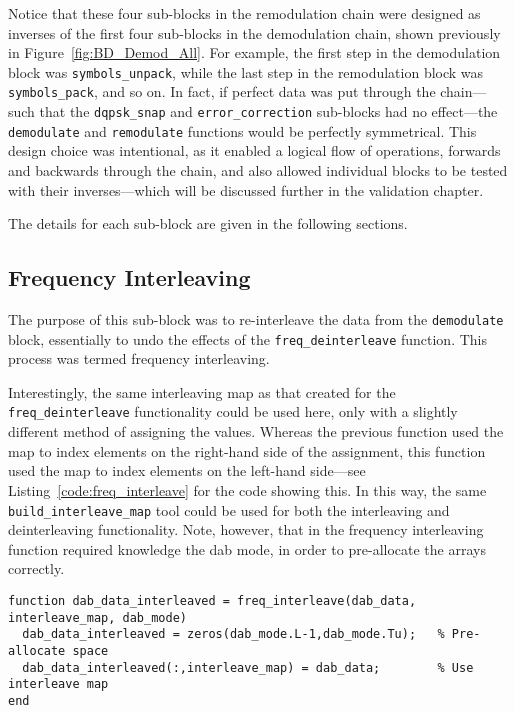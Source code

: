 \documentclass[class=report,11pt,crop=false]{standalone}
\begin{document}
Notice that these four sub-blocks in the remodulation chain were designed as inverses of the first four sub-blocks in the demodulation chain, shown previously in Figure~\ref{fig:BD_Demod_All}. For example, the first step in the demodulation block was \texttt{symbols\_unpack}, while the last step in the remodulation block was \texttt{symbols\_pack}, and so on. In fact, if perfect data was put through the chain---such that the \texttt{dqpsk\_snap} and \texttt{error\_correction} sub-blocks had no effect---the \texttt{demodulate} and \texttt{remodulate} functions would be perfectly symmetrical. This design choice was intentional, as it enabled a logical flow of operations, forwards and backwards through the chain, and also allowed individual blocks to be tested with their inverses---which will be discussed further in the validation chapter.

The details for each sub-block are given in the following sections.

\subsection{Frequency Interleaving \label{subsect:dab-proc_freq-interleave}}
The purpose of this sub-block was to re-interleave the data from the \texttt{demodulate} block, essentially to undo the effects of the \texttt{freq\_deinterleave} function. This process was termed frequency interleaving.

Interestingly, the same interleaving map as that created for the \texttt{freq\_deinterleave} functionality could be used here, only with a slightly different method of assigning the values. Whereas the previous function used the map to index elements on the right-hand side of the assignment, this function used the map to index elements on the left-hand side---see Listing~\ref{code:freq_interleave} for the code showing this. In this way, the same \texttt{build\_interleave\_map} tool could be used for both the interleaving and deinterleaving functionality. Note, however, that in the frequency interleaving function required knowledge the \gls{dab} mode, in order to pre-allocate the arrays correctly.

\begin{lstlisting}[caption={\textsc{Matlab} code for the frequency interleaving functionality.},label={code:freq_interleave}]
function dab_data_interleaved = freq_interleave(dab_data, interleave_map, dab_mode)
  dab_data_interleaved = zeros(dab_mode.L-1,dab_mode.Tu);   % Pre-allocate space
  dab_data_interleaved(:,interleave_map) = dab_data;        % Use interleave map
end
\end{lstlisting}
\end{document}
